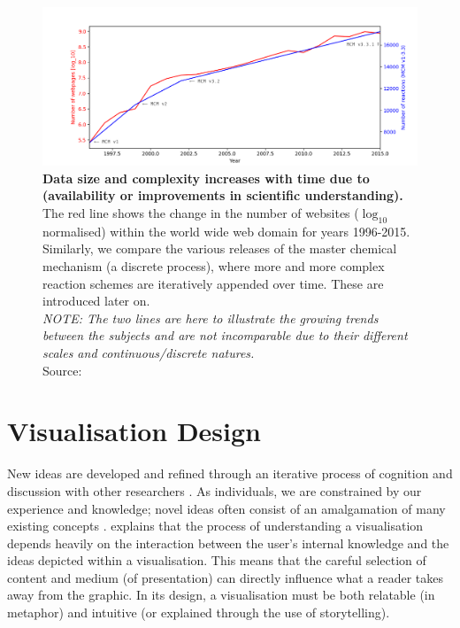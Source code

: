 \begin{figure}[H]
     \centering
         \includegraphics[width=.95\textwidth]{figures_c1/webmcm.png}
         \caption{\textbf{Data size and complexity increases with time due to (availability or improvements in scientific understanding).} The red line shows the change in the number of websites ($\log_{10}$ normalised) within the world wide web domain for years 1996-2015. Similarly, we compare the various releases of the master chemical mechanism (a discrete process), where more and more complex reaction schemes are iteratively appended over time. These are introduced later on. \\
 \emph{NOTE: The two lines are here to illustrate the growing trends between the subjects and are not incomparable due to their different scales and continuous/discrete natures.}\\ Source: \citep{webstats,mcmhist}}
         \label{fig:webmcm}
\end{figure}


\section{Visualisation Design}\label{sec:visdes}

New ideas are developed and refined through an iterative process of cognition and discussion with other researchers \citep{ch7}. As individuals, we are constrained by our experience and knowledge; novel ideas often consist of an amalgamation of many existing concepts \citep{wingedhorse,goodideas}. \citep{shapinginfo} explains that the process of understanding a visualisation depends heavily on the interaction between the user's internal knowledge and the ideas depicted within a visualisation.
This means that the careful selection of content and medium (of presentation) can directly influence what a reader takes away from the graphic. In its design, a visualisation must be both relatable (in metaphor) and intuitive (or explained through the use of storytelling).

